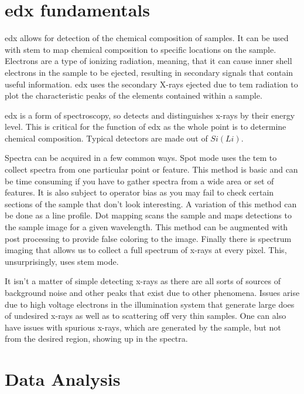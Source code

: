 \documentclass[12pt,a4paper]{article}
\begin{document}
\section{\ac{edx} fundamentals} %
\label{sec:edx}

\ac{edx} allows for detection of the chemical composition of samples.  It can be used with \ac{stem} to map chemical composition to specific locations on the sample.  Electrons are a type of ionizing radiation, meaning, that it can cause inner shell electrons in the sample to be ejected, resulting in secondary signals that contain useful information.  \ac{edx} uses the secondary X-rays ejected due to \ac{tem} radiation to plot the characteristic peaks of the elements contained within a sample.   

\ac{edx} is a form of spectroscopy, so detects and distinguishes x-rays by their energy level.  This is critical for the function of \ac{edx} as the whole point is to determine chemical composition.  Typical detectors are made out of $Si(Li)$.

Spectra can be acquired in a few common ways.  Spot mode uses the \ac{tem} to collect spectra from one particular point or feature.  This method is basic and can be time consuming if you have to gather spectra from a wide area or set of features.  It is also subject to operator bias as you may fail to check certain sections of the sample that don't look interesting.   A variation of this method can be done as a line profile.  Dot mapping scans the sample and maps detections to the sample image for a given wavelength.  This method can be augmented with post processing to provide false coloring to the image.  Finally there is spectrum imaging that allows us to collect a full spectrum of x-rays at every pixel.  This, unsurprisingly, uses \ac{stem} mode.

It isn't a matter of simple detecting x-rays as there are all sorts of sources of background noise and other peaks that exist due to other phenomena.  Issues arise due to high voltage electrons in the illumination system that generate large does of undesired x-rays as well as to scattering off very thin samples.  One can also have issues with spurious x-rays, which are generated by the sample, but not from the desired region, showing up in the spectra.

\section{Data Analysis} %
\label{sec:data_analysis}
\end{document}
